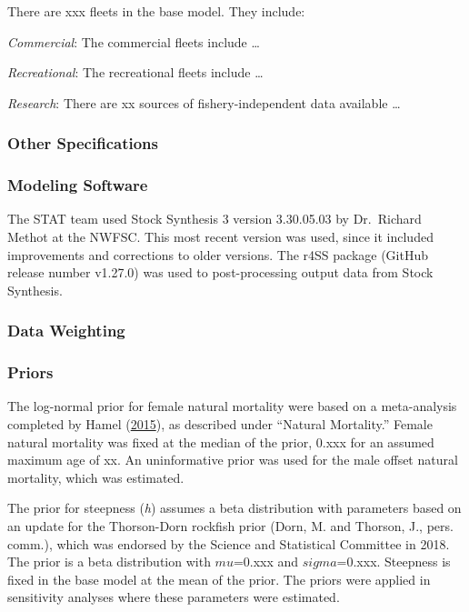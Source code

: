 \documentclass[12pt,]{article}
\begin{document}
There are xxx fleets in the base model. They include:

\emph{Commercial}: The commercial fleets include \ldots{}

\emph{Recreational}: The recreational fleets include \ldots{}

\emph{Research}: There are xx sources of fishery-independent data
available \ldots{}

\subsubsection{Other Specifications}\label{other-specifications}

\subsubsection{Modeling Software}\label{modeling-software}

The STAT team used Stock Synthesis 3 version 3.30.05.03 by Dr.~Richard
Methot at the NWFSC. This most recent version was used, since it
included improvements and corrections to older versions. The r4SS
package (GitHub release number v1.27.0) was used to post-processing
output data from Stock Synthesis.

\subsubsection{Data Weighting}\label{data-weighting}

\subsubsection{Priors}\label{priors}

The log-normal prior for female natural mortality were based on a
meta-analysis completed by Hamel
(\protect\hyperlink{ref-Hamel2015}{2015}), as described under ``Natural
Mortality.'' Female natural mortality was fixed at the median of the
prior, 0.xxx for an assumed maximum age of xx. An uninformative prior
was used for the male offset natural mortality, which was estimated.

The prior for steepness (\emph{h}) assumes a beta distribution with
parameters based on an update for the Thorson-Dorn rockfish prior (Dorn,
M. and Thorson, J., pers. comm.), which was endorsed by the Science and
Statistical Committee in 2018. The prior is a beta distribution with
\(mu\)=0.xxx and \(sigma\)=0.xxx. Steepness is fixed in the base model
at the mean of the prior. The priors were applied in sensitivity
analyses where these parameters were estimated.
\end{document}
